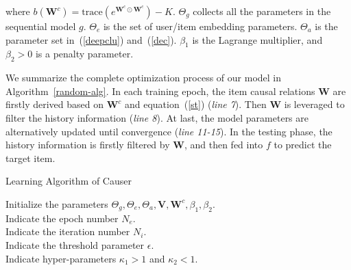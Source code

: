\documentclass[conference]{IEEEtran}
\theoremstyle{definition}
\theoremstyle{theorem}
\theoremstyle{proof}
\theoremstyle{remark}
\begin{document}
where $b(\bm{W}^c) = \text{trace}(e^{\bm{W}^c\odot \bm{W}^c}) - K$.
$\Theta_{g}$ collects all the parameters in the sequential model $g$.
$\Theta_{e}$ is the set of user/item embedding parameters.
$\Theta_{a}$ is the parameter set in~(\ref{deepclu}) and~(\ref{dec}).
$\beta_1$ is the Lagrange multiplier, and $\beta_2>0$ is a penalty parameter.


We summarize the complete optimization process of our model in Algorithm~\ref{random-alg}.
In each training epoch, the item causal relations $\bm{W}$ are firstly derived based on $\bm{W}^c$ and equation~(\ref{st}) (\textit{line 7}).
Then $\bm{W}$ is leveraged to filter the history information (\textit{line 8}). 
At last, the model parameters are alternatively updated until convergence (\textit{line 11-15}).
In the testing phase, the history information is firstly filtered by $\bm{W}$, and then fed into $f$ to predict the target item.

\begin{algorithm}[t] 
	\caption{Learning Algorithm of Causer} 
	\label{random-alg} 
	Initialize the parameters $\Theta_{g}, \Theta_{e}, \Theta_{a}, \bm{V}, \bm{W}^c, \beta_1, \beta_2$.\\
	Indicate the epoch number $N_e$.\\
	Indicate the iteration number $N_i$.\\
	Indicate the threshold parameter $\epsilon$.\\
	Indicate hyper-parameters $\kappa_1>1$ and $\kappa_2<1$.\\
\end{algorithm}
\end{document}
